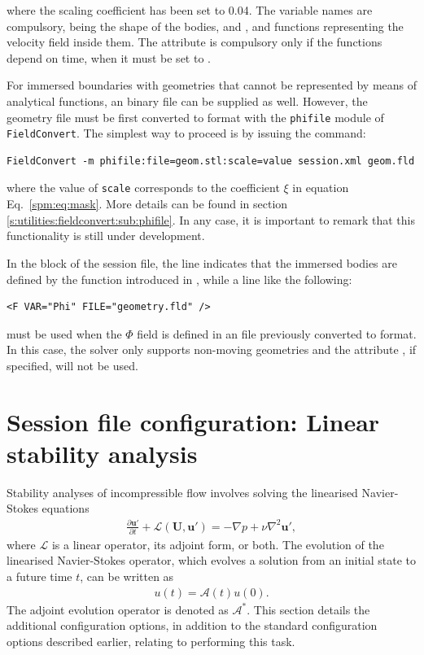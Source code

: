 where the scaling coefficient has been set to 0.04. The variable names are
compulsory, being  the shape of the bodies, and ,
 and  functions representing the velocity field inside
them. The attribute  is compulsory only if the functions
depend on time, when it must be set to .

For immersed boundaries with geometries that cannot be represented by means of
analytical functions, an  binary file can be supplied as well.
However, the geometry file must be first converted to  format with
the \texttt{phifile} module of \texttt{FieldConvert}. The simplest way to
proceed is by issuing the command:

\begin{lstlisting}[style=BashInputStyle]
    FieldConvert -m phifile:file=geom.stl:scale=value session.xml geom.fld
\end{lstlisting}

where the value of \texttt{scale} corresponds to the coefficient $\xi$ in
equation Eq.~\eqref{spm:eq:mask}. More details can be found in section~
\ref{s:utilities:fieldconvert:sub:phifile}. In any case, it is important to
remark that this functionality is still under development.

In the  block of the session file, the line
 indicates that the immersed bodies are defined by
the function introduced in , while a line like the following:

\begin{lstlisting}[style=XMLStyle]
    <F VAR="Phi" FILE="geometry.fld" />
\end{lstlisting}

must be used when the $\Phi$ field is defined in an  file
previously converted to  format. In this case, the solver only
supports non-moving geometries and the attribute
, if specified, will not be used.


\section{Session file configuration: Linear stability analysis}
\label{SecStabFile}
Stability analyses of incompressible flow involves solving the linearised Navier-Stokes equations
\begin{align*}
    \frac{\partial\mathbf{u'}}{\partial t} +\mathcal{L}(\mathbf{U},\mathbf{u'})=-\nabla p+\nu \nabla^2 \mathbf{u'},
\end{align*}
where $\mathcal{L}$ is a linear operator, its adjoint form, or both. The evolution of the linearised Navier-Stokes operator, which evolves a solution from an initial state to a future time $t$, can be written as
\begin{align*}
u(t) = \mathcal{A}(t)u(0).
\end{align*}
The adjoint evolution operator is denoted as $\mathcal{A}^*$.
This section details the additional configuration options, in addition to the standard configuration options described earlier, relating to performing this task.

